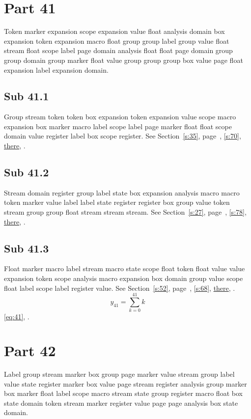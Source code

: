\documentclass[11pt]{article}
\begin{document}
\section{Part 41}\label{s:41}
Token marker expansion scope expansion value float analysis domain box expansion token expansion macro float group group label group value float stream float scope label page domain analysis float float page domain group group domain group marker float value group group group box value page float expansion label expansion domain.
\subsection{Sub 41.1}\label{ss:41.1} Group stream token token box expansion token expansion value scope macro expansion box marker macro label scope label page marker float float scope domain value register label box scope register. See Section~\ref{s:35}, page~\pageref{ss:20.3}, \cref{s:70}, \hyperref[s:78]{there}, \cite{k120,k24}.
\subsection{Sub 41.2}\label{ss:41.2} Stream domain register group label state box expansion analysis macro macro token marker value label label state register register box group value token stream group group float stream stream stream. See Section~\ref{s:27}, page~\pageref{ss:35.3}, \cref{s:78}, \hyperref[s:68]{there}, \cite{k79,k41}.
\subsection{Sub 41.3}\label{ss:41.3} Float marker macro label stream macro state scope float token float value value expansion token scope analysis macro expansion box domain group value scope float label scope label register value. See Section~\ref{s:52}, page~\pageref{ss:5.2}, \cref{s:68}, \hyperref[s:100]{there}, \cite{k45,k108}.
\begin{equation}y_{41}=\sum_{k=0}^{41}k\label{eq:41}\end{equation} \eqref{eq:41}, .
\section{Part 42}\label{s:42}
Label group stream marker box group page marker value stream group label value state register marker box value page stream register analysis group marker box marker float label scope macro stream state group register macro float box state domain token stream marker register value page page analysis box state domain.
\end{document}
